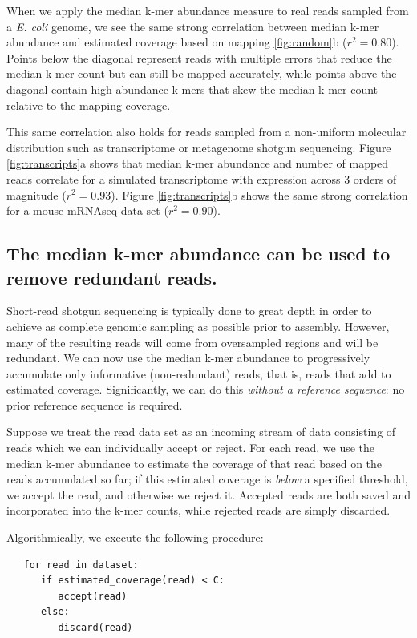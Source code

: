 \documentclass[10pt]{article}
\begin{document}
When we apply the median k-mer abundance measure to real reads sampled
from a {\em E. coli} genome, we see the same strong correlation
between median k-mer abundance and estimated coverage based on mapping
\ref{fig:random}b ($r^2=0.80$).  Points below the diagonal represent
reads with multiple errors that reduce the median k-mer count but can
still be mapped accurately, while points above the diagonal contain
high-abundance k-mers that skew the median k-mer count relative to
the mapping coverage.

This same correlation also holds for reads sampled from a non-uniform
molecular distribution such as transcriptome or metagenome shotgun
sequencing.  Figure \ref{fig:transcripts}a shows that median k-mer
abundance and number of mapped reads correlate for a simulated
transcriptome with expression across 3 orders of magnitude ($r^2 =
0.93$).  Figure \ref{fig:transcripts}b shows the same strong
correlation for a mouse mRNAseq data set ($r^2 = 0.90$).

\subsection*{The median k-mer abundance can be used to remove redundant reads.}

Short-read shotgun sequencing is typically done to great depth in order
to achieve as complete genomic sampling as possible prior to assembly.
However, many of the resulting reads will come from oversampled regions
and will be redundant.
We can now use the median k-mer abundance to progressively accumulate
only informative (non-redundant) reads, that is, reads that add
to estimated coverage.  Significantly, we can do this
{\em without a reference sequence}: no prior reference sequence is required.

Suppose we treat the read data set as an incoming stream of data
consisting of reads which we can individually accept or reject.  For
each read, we use the median k-mer abundance to estimate the coverage
of that read based on the reads accumulated so far; if this estimated
coverage is {\em below} a specified threshold, we accept the read, and
otherwise we reject it.  Accepted reads are both saved and
incorporated into the k-mer counts, while rejected reads are simply
discarded.

Algorithmically, we execute the following procedure:

\begin{verbatim}
   for read in dataset:
      if estimated_coverage(read) < C:
         accept(read)
      else:
         discard(read)
\end{verbatim}
\end{document}
